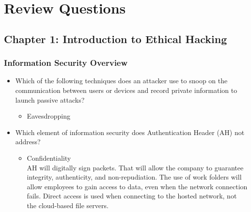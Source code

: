 \section{Review Questions}

\subsection{Chapter 1: Introduction to Ethical Hacking}
\subsubsection{Information Security Overview}
\begin{itemize}
    \item Which of the following techniques does an attacker use to snoop on the communication between users or devices and record private information to launch passive attacks?
    \begin{itemize}
        \item Eavesdropping
    \end{itemize}
    \item Which element of information security does Authentication Header (AH) not address?
    \begin{itemize}
        \item Confidentiality\\
        AH will digitally sign packets. That will allow the company to guarantee integrity, authenticity, and non-repudiation. The use of work folders will allow employees to gain access to data, even when the network connection fails. Direct access is used when connecting to the hosted network, not the cloud-based file servers.
    \end{itemize}
\end{itemize}
